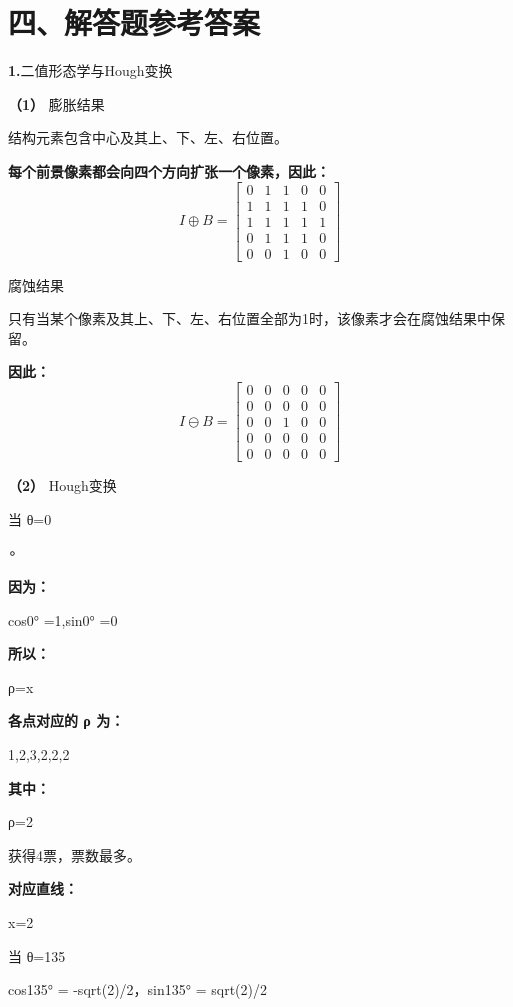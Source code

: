 \documentclass[UTF8,openany,oneside,zihao=-4,fontset=windows]{ctexbook}
\newcommand{\Question}[2]{%
  \par\Needspace{4\baselineskip}\medskip
  \noindent\textbf{\color{MVBlue}#1}\quad #2\par
}
\begin{document}
\section{四、解答题参考答案}
\Question{1.}{二值形态学与Hough变换}
\par\noindent\textbf{（1）} 膨胀结果
\par 结构元素包含中心及其上、下、左、右位置。
\par\noindent\textbf{每个前景像素都会向四个方向扩张一个像素，因此：}
\[
I\oplus B = \begin{bmatrix}
0 & 1 & 1 & 0 & 0 \\
1 & 1 & 1 & 1 & 0 \\
1 & 1 & 1 & 1 & 1 \\
0 & 1 & 1 & 1 & 0 \\
0 & 0 & 1 & 0 & 0
\end{bmatrix}
\]
\par 腐蚀结果
\par 只有当某个像素及其上、下、左、右位置全部为1时，该像素才会在腐蚀结果中保留。
\par\noindent\textbf{因此：}
\[
I\ominus B = \begin{bmatrix}
0 & 0 & 0 & 0 & 0 \\
0 & 0 & 0 & 0 & 0 \\
0 & 0 & 1 & 0 & 0 \\
0 & 0 & 0 & 0 & 0 \\
0 & 0 & 0 & 0 & 0
\end{bmatrix}
\]
\par\noindent\textbf{（2）} Hough变换
\par 当 θ=0
\par ∘
\par\noindent\textbf{因为：}
\begin{center}\small\ttfamily cos0° =1,sin0° =0\end{center}
\par\noindent\textbf{所以：}
\par ρ=x
\par\noindent\textbf{各点对应的 ρ 为：}
\par 1,2,3,2,2,2
\par\noindent\textbf{其中：}
\par ρ=2
\par 获得4票，票数最多。
\par\noindent\textbf{对应直线：}
\par x=2
\par 当 θ=135
\begin{center}\small\ttfamily cos135° = -sqrt(2)/2，sin135° = sqrt(2)/2\end{center}
\end{document}
